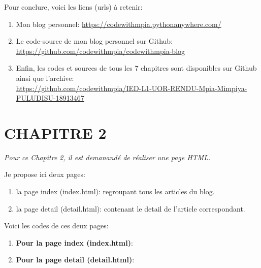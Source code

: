 \documentclass[a4paper,11pt]{article}
\begin{document}
        \bigskip
        \begin{tcolorbox}[colback=lightgray!6, colframe=black, left=1mm, right=2mm, top=2mm, bottom=1mm, boxrule=0.1mm]
            Pour conclure, voici les liens (urls) à retenir: 
            
            \begin{enumerate}
                \item Mon blog personnel: \url{https://codewithmpia.pythonanywhere.com/}
                \item Le code-source de mon blog personnel sur Github:\\ \url{https://github.com/codewithmpia/codewithmpia-blog}
                \item Enfin, les codes et sources de tous les 7 chapitres sont disponibles sur Github ainsi que l'archive:\\ 
                \url{https://github.com/codewithmpia/IED-L1-UOR-RENDU-Mpia-Mimpiya-PULUDISU-18913467}
            \end{enumerate}
        \end{tcolorbox}

    \newpage
    \section{CHAPITRE 2}
        \noindent \textit{Pour ce Chapitre 2, il est demanandé de réaliser une page HTML.}

        \bigskip
        \noindent Je propose ici deux pages:
            \begin{enumerate}
                \item la page index (index.html): regroupant tous les articles du blog.
                \item la page detail (detail.html): contenant le detail de l'article correspondant.
            \end{enumerate}
        
        \bigskip
        \noindent Voici les codes de ces deux pages: 

        \begin{enumerate}
            \item \textbf{Pour la page index (index.html)}:
                
            \item   \textbf{Pour la page detail (detail.html)}:
                
        \end{enumerate}
\end{document}
